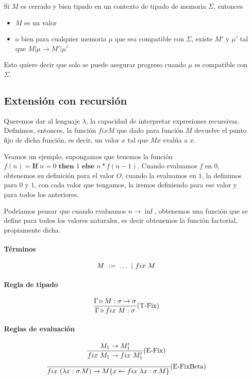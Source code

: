 \begin{centrado}
	Si $M$ es cerrado y bien tipado en un contexto de tipado de memoria $\Sigma$, entonces
	\begin{itemize}
		\item $M$ es un valor
		\item o bien para cualquier memoria $\mu$ que sea compatible con $\Sigma$, existe $M'$ y $\mu'$ tal que $M|\mu\to M'|\mu'$
	\end{itemize}
\end{centrado}

Esto quiere decir que solo se puede asegurar progreso cuando $\mu$ es compatible con $\Sigma$.

\subsection{Extensión con recursión}\label{lambda_calculo:recursion}
Queremos dar al lenguaje $\lambda$, la capacidad de interpretar expresiones recursivas. Definimos, entonces, la función $fix M$ que dado para función $M$ devuelve el punto fijo de dicha función, es decir, un valor $x$ tal que $M x$ evalúa a $x$.

Veamos un ejemplo, supongamos que tenemos la función $f(n) = \textbf{If } n=0 \textbf{ then } 1 \textbf{ else } n*f(n-1)$. Cuando evaluamos $f$ en $0$, obtenemos su definición para el valor $O$, cuando la evaluamos en $1$, la definimos para $0$ y $1$, con cada valor que tengamos, la iremos definiendo para ese valor y para todos los anteriores. 

Podríamos pensar que cuando evaluamos $n\to\inf$, obtenemos una función que se define para todos los valores naturales, es decir obtenemos la función factorial, propiamente dicha.

\paragraph{Términos}
$$M~:=~\dots~|~fix~M$$

\paragraph{Regla de tipado}
\begin{equation*}
	\frac{\Gamma\triangleright M : \sigma\to\sigma}{\Gamma\triangleright fix~M : \sigma}(\text{T-Fix})
\end{equation*}

\paragraph{Reglas de evaluación}
\begin{equation*}
	\frac{M_1\to M'_1}{fix~M_1\to fix~M'_1}(\text{E-Fix})
\end{equation*}
\vspace*{5mm}
\begin{equation*}
	\frac{}{fix~(\lambda x: \sigma . M)\to M\{x\leftarrow fix~\lambda x: \sigma . M\}}(\text{E-FixBeta})
\end{equation*}
